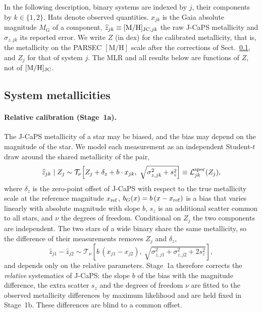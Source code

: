 \documentclass{aa}
\newcommand{\StudentT}{\mathcal{T}}
\begin{document}
In the following description, binary systems are indexed by $j$, their components by $k\in\{1,2\}$. Hats denote observed quantities. $x_{jk}$ is the Gaia absolute magnitude $M_{\mathrm{G}}$ of a component, $\widehat z_{jk}\equiv[\mathrm{M/H}]_{{\rm JC},jk}$ the raw J-CaPS metallicity and $\sigma_{z,jk}$ its reported error. We write $Z$ (in dex) for the calibrated metallicity, that is, the metallicity on the PARSEC $[\mathrm{M/H}]$ scale after the corrections of Sect.~\ref{sec:stage1}, and $Z_j$ for that of system $j$. The MLR and all results below are functions of $Z$, not of $[\mathrm{M/H}]_{\rm JC}$. 

\subsection{System metallicities}\label{sec:stage1}
\paragraph{Relative calibration (Stage~1a).} The J-CaPS metallicity of a star may be biased, and the bias may depend on the magnitude of the star. We model each measurement as an independent Student-$t$ draw around the shared metallicity of the pair,
\begin{equation}
 \widehat z_{jk}\mid Z_j \sim \StudentT_{\nu}\!\left[Z_j+\delta_z+b\cdot x_{jk},\ \sqrt{\sigma_{z,jk}^2+s_z^2}\right]\equiv\mathcal L^{\rm spec}_{jk}(Z_j),
 \label{eq:spec-model}
\end{equation}
where $\delta_z$ is the zero-point offset of J-CaPS with respect to the true metallicity scale at the reference magnitude $x_{\rm ref}$, $b_G(x)=b\,(x-x_{\rm ref})$ is a bias that varies linearly with absolute magnitude with slope $b$, $s_z$ is an additional scatter common to all stars, and $\nu$ the degrees of freedom. Conditional on $Z_j$ the two components are independent. The two stars of a wide binary share the same metallicity, so the difference of their measurements removes $Z_j$ and $\delta_z$,
\begin{equation}
 \widehat z_{j1}-\widehat z_{j2}\sim\StudentT_{\nu}\!\left[b\,(x_{j1}-x_{j2}),\ \sqrt{\sigma_{z,j1}^2+\sigma_{z,j2}^2+2s_z^2}\right],
 \label{eq:zdiff}
\end{equation}
and depends only on the relative parameters. Stage~1a therefore corrects the \emph{relative} systematics of J-CaPS: the slope $b$ of the bias with the magnitude difference, the extra scatter $s_z$ and the degrees of freedom $\nu$ are fitted to the observed metallicity differences by maximum likelihood and are held fixed in Stage~1b. These differences are blind to a common offset.
\end{document}

